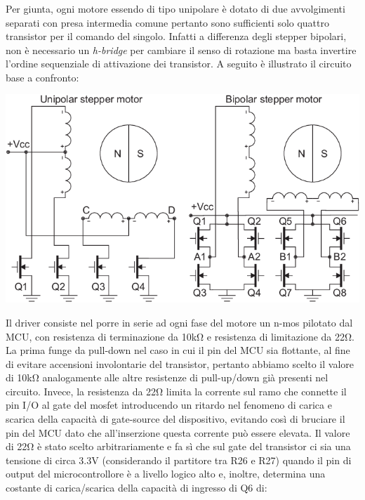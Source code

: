 \hypertarget{section-4}{%
\subsubsection{}\label{section-4}}

Per giunta, ogni motore essendo di tipo unipolare è dotato di due
avvolgimenti separati con presa intermedia comune pertanto sono
sufficienti solo quattro transistor per il comando del singolo. Infatti
a differenza degli stepper bipolari, non è necessario un \emph{h-bridge}
per cambiare il senso di rotazione ma basta invertire l'ordine
sequenziale di attivazione dei transistor. A seguito è illustrato il
circuito base a confronto:

\begin{center}
\includegraphics[scale=0.6]{figures/image75.png}
\captionsetup{type=figure}
\end{center}

Il driver consiste nel porre in serie ad ogni fase del motore un n-mos
pilotato dal MCU, con resistenza di terminazione da 10kΩ e resistenza di
limitazione da 22Ω. La prima funge da pull-down nel caso in cui il pin
del MCU sia flottante, al fine di evitare accensioni involontarie del
transistor, pertanto abbiamo scelto il valore di 10kΩ analogamente alle
altre resistenze di pull-up/down già presenti nel circuito. Invece, la
resistenza da 22Ω limita la corrente sul ramo che connette il pin I/O al
gate del mosfet introducendo un ritardo nel fenomeno di carica e scarica
della capacità di gate-source del dispositivo, evitando così di bruciare
il pin del MCU dato che all'inserzione questa corrente può essere
elevata. Il valore di 22Ω è stato scelto arbitrariamente e fa sì che sul
gate del transistor ci sia una tensione di circa 3.3V (considerando il
partitore tra R26 e R27) quando il pin di output del microcontrollore è
a livello logico alto e, inoltre, determina una costante di
carica/scarica della capacità di ingresso di Q6 di:

